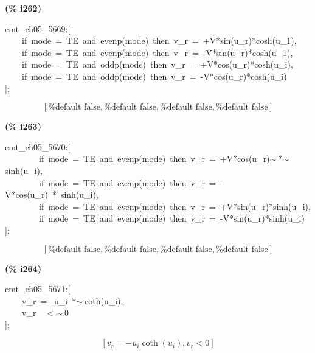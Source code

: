 \documentclass[fleqn]{article}
\begin{document}
\noindent
\begin{minipage}[t]{4.000000em}\color{red}\bfseries
(\% i262)	
\end{minipage}
\begin{minipage}[t]{\textwidth}\color{blue}
cmt\_ch05\_5669:[\\
\ \ \ \ if\ mode\ =\ TE\ and\ evenp(mode)\ then\ v\_r\ =\ +V*sin(u\_r)*cosh(u\_1),\\
\ \ \ \ if\ mode\ =\ TE\ and\ evenp(mode)\ then\ v\_r\ =\ -V*sin(u\_r)*cosh(u\_1),\\
\ \ \ \ if\ mode\ =\ TE\ and\ oddp(mode)\ then\ v\_r\ =\ +V*cos(u\_r)*cosh(u\_i),\\
\ \ \ \ if\ mode\ =\ TE\ and\ oddp(mode)\ then\ v\_r\ =\ -V*cos(u\_r)*cosh(u\_i)\ \ \\
];
\end{minipage}
\[\displaystyle \tag{\% o262} 
\left[ \mbox{%
false}\operatorname{,}\mbox{%
false}\operatorname{,}\mbox{%
false}\operatorname{,}\mbox{%
false}\right] \mbox{}
\]


\noindent
\begin{minipage}[t]{4.000000em}\color{red}\bfseries
(\% i263)	
\end{minipage}
\begin{minipage}[t]{\textwidth}\color{blue}
cmt\_ch05\_5670:[\\
\ \ \ \ \ \ \ \ if\ mode\ =\ TE\ and\ evenp(mode)\ then\ v\_r\ =\ +V*cos(u\_r)\ensuremath{\sim\ }*\ensuremath{\sim\ }sinh(u\_i),\\
\ \ \ \ \ \ \ \ if\ mode\ =\ TE\ and\ evenp(mode)\ then\ v\_r\ =\ -V*cos(u\_r)\ *\ sinh(u\_i),\\
\ \ \ \ \ \ \ \ if\ mode\ =\ TE\ and\ evenp(mode)\ then\ v\_r\ =\ +V*sin(u\_r)*sinh(u\_i),\\
\ \ \ \ \ \ \ \ if\ mode\ =\ TE\ and\ evenp(mode)\ then\ v\_r\ =\ -V*sin(u\_r)*sinh(u\_i)\\
];
\end{minipage}
\[\displaystyle \tag{\% o263} 
\left[ \mbox{%
false}\operatorname{,}\mbox{%
false}\operatorname{,}\mbox{%
false}\operatorname{,}\mbox{%
false}\right] \mbox{}
\]


\noindent
\begin{minipage}[t]{4.000000em}\color{red}\bfseries
(\% i264)	
\end{minipage}
\begin{minipage}[t]{\textwidth}\color{blue}
cmt\_ch05\_5671:[\\
\ \ \ \ v\_r\ =\ -u\_i\ *\ensuremath{\sim\ }coth(u\_i),\\
\ \ \ \ v\_r\ \ \ensuremath{<}\ensuremath{\sim\ }0\\
];
\end{minipage}
\[\displaystyle \tag{\% o264} 
\left[ {v_r}=-{u_i} \operatorname{coth}\left( {u_i}\right) \operatorname{,}{v_r}\operatorname{<  }0\right] \mbox{}
\]
\end{document}
